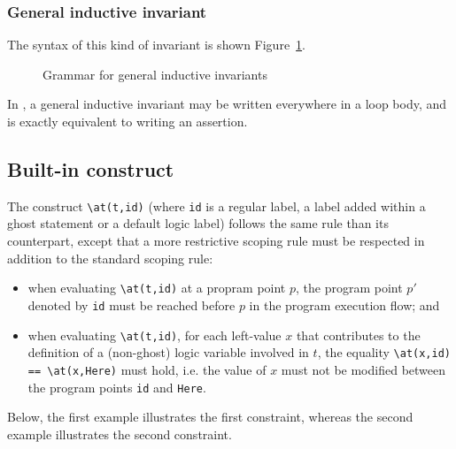 \subsubsection{General inductive invariant}
\label{sec:generalized-invariants}

The syntax of this kind of invariant is shown
Figure~\ref{fig:advancedinvariants}.

\begin{figure}[htbp]
  \begin{cadre}
    
  \end{cadre}
  \caption{Grammar for general inductive invariants}
  \label{fig:advancedinvariants}
\end{figure}

In \eacsl, a general inductive invariant may be written everywhere in a loop
body, and is exactly equivalent to writing an assertion.


\subsection{Built-in construct \texorpdfstring{\at}{\textbackslash{}at}}
\label{sec:at}


The construct \verb|\at(t,id)| (where \verb|id| is a regular \C label, a label
added within a ghost statement or a default logic label)
follows the same rule than its \acsl counterpart, except that a more restrictive
scoping rule must be respected in addition to the standard \acsl scoping rule:
\begin{itemize}
\item when evaluating \verb|\at(t,id)| at a propram point $p$, the program point
  $p'$ denoted by \verb|id| must be reached before $p$ in the program execution
  flow; and
\item when evaluating \verb|\at(t,id)|, for each \C left-value $x$ that
  contributes to the definition of a (non-ghost) logic variable involved in $t$,
  the equality \verb|\at(x,id) == \at(x,Here)| must hold, i.e. the value of $x$
  must not be modified between the program points \verb|id| and \verb|Here|.
\end{itemize}

Below, the first example illustrates the first constraint, whereas the second
example illustrates the second constraint.

